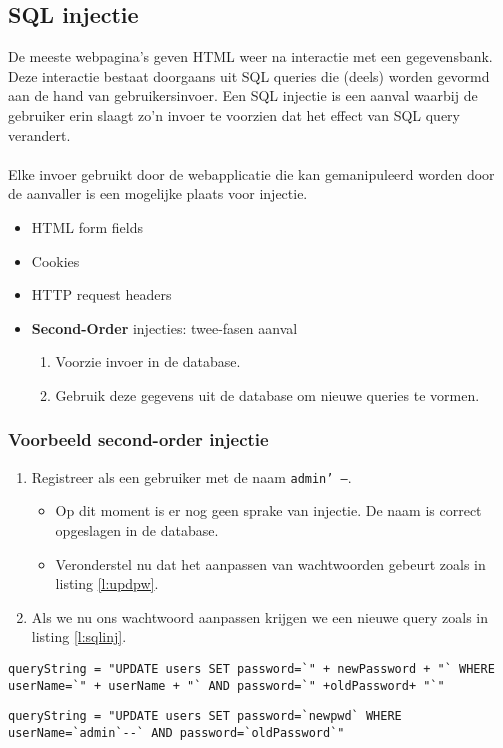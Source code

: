 \documentclass[../main.tex]{subfiles}
\begin{document}
\subsection{SQL injectie}
De meeste webpagina's geven HTML weer na interactie met een gegevensbank. Deze interactie bestaat doorgaans uit SQL queries die (deels) worden gevormd aan de hand van gebruikersinvoer. Een SQL injectie is een aanval waarbij de gebruiker erin slaagt zo'n invoer te voorzien dat het effect van SQL query verandert. 
\\\\
Elke invoer gebruikt door de webapplicatie die kan gemanipuleerd worden door de aanvaller is een mogelijke plaats voor injectie.
\begin{itemize}
	\item HTML form fields
	\item Cookies
	\item HTTP request headers
	\item \textbf{Second-Order} injecties: twee-fasen aanval
	\begin{enumerate}
		\item Voorzie invoer in de database.
		\item Gebruik deze gegevens uit de database om nieuwe queries te vormen.	
	\end{enumerate}
\end{itemize}

\subsubsection{Voorbeeld second-order injectie}
\begin{enumerate}
	\item Registreer als een gebruiker met de naam \texttt{admin' --}.
	\begin{itemize}
		\item Op dit moment is er nog geen sprake van injectie. De naam is correct opgeslagen in de database.
		\item Veronderstel nu dat het aanpassen van wachtwoorden gebeurt zoals in listing \ref{l:updpw}.
	\end{itemize}
	\item Als we nu ons wachtwoord aanpassen krijgen we een nieuwe query zoals in listing \ref{l:sqlinj}.
\end{enumerate}
\begin{lstlisting}[caption=Updaten wachtwoord, label=l:updpw]
queryString = "UPDATE users SET password=`" + newPassword + "` WHERE userName=`" + userName + "` AND password=`" +oldPassword+ "`"
\end{lstlisting}
\begin{lstlisting}[caption=SQL Injection, label=l:sqlinj]
queryString = "UPDATE users SET password=`newpwd` WHERE userName=`admin`--` AND password=`oldPassword`"
\end{lstlisting}
\end{document}
